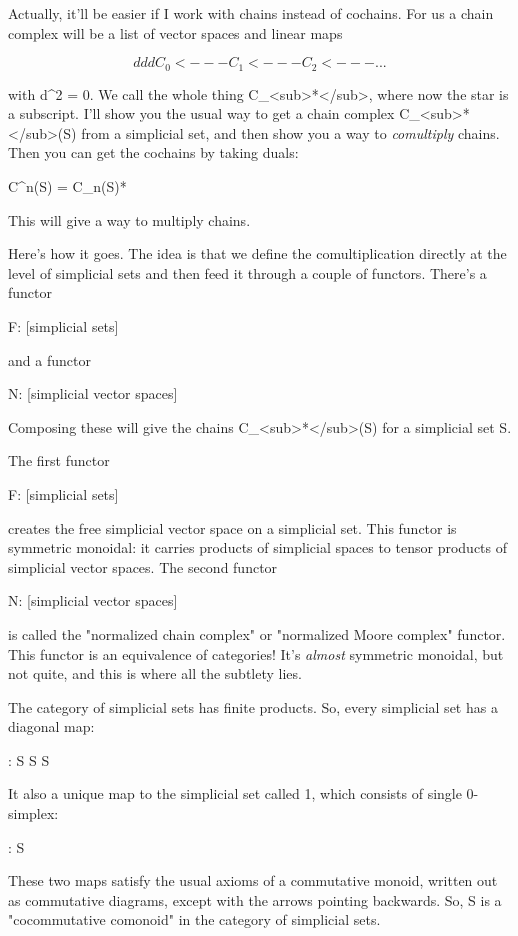 Actually, it'll be easier if I work with chains instead of cochains.
For us a chain complex will be a list of vector spaces and linear maps

$$
     d       d      d
C_{0} <--- C_{1} <--- C_{2} <--- ...
$$
    

with d^{2} = 0.  We call the whole thing
C_{<sub>*}</sub>, where now the star is a subscript.  I'll
show you the usual way to get a chain complex
C_{<sub>*}</sub>(S) from a simplicial set, and then show you a
way to \emph{comultiply} chains.  Then you can get the cochains by
taking duals:

C^{n}(S) = C_{n}(S)*

This will give a way to multiply chains.

Here's how it goes.  The idea is that we define the comultiplication
directly at the level of simplicial sets and then feed it through a
couple of functors.  There's a functor 

F: [simplicial sets] 

and a functor

N: [simplicial vector spaces] 

Composing these will give the chains C_{<sub>*}</sub>(S) for a simplicial set S.

The first functor 

F: [simplicial sets] 

creates the free simplicial vector space on a simplicial set.  
This functor is symmetric monoidal: it carries products of simplicial
spaces to tensor products of simplicial vector spaces.  The second
functor

N: [simplicial vector spaces] 

is called the "normalized chain complex" or "normalized Moore
complex" functor.  This functor is an equivalence of categories! 
It's \emph{almost} symmetric monoidal, but not quite, and this is 
where all the subtlety lies.

The category of simplicial sets has finite products.  So, every
simplicial set has a diagonal map:

\Delta : S \to  S \times  S

It also a unique map to the simplicial set called 1, which 
consists of single 0-simplex:

\epsilon : S 

These two maps satisfy the usual axioms of a commutative monoid,
written out as commutative diagrams, except with the arrows pointing
backwards.  So, S is a "cocommutative comonoid" in the category of
simplicial sets.  

